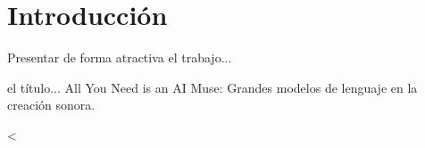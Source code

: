 \chapter{Introducción}

Presentar de forma atractiva el trabajo... 


el título... All You Need is an AI Muse: Grandes modelos de lenguaje en la creación sonora.

<





